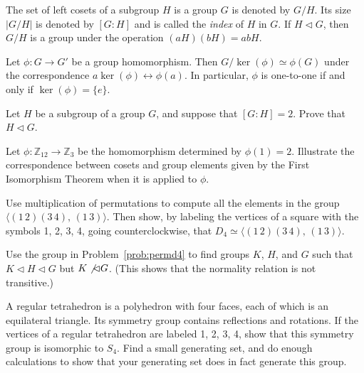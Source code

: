 \begin{theorem}
 The set of left cosets of a subgroup $H$ is a group $G$ is denoted by $G/H$. Its size $|G/H|$ is denoted by $[G:H]$ and is called the \emph{index} of $H$ in $G$.
 If $H\lhd G$, then $G/H$ is a group under the operation $(aH)(bH)=abH$.
\end{theorem}

\begin{theorem}
 Let $\phi:G \longrightarrow G'$ be a group homomorphism. Then $G/\ker(\phi) \simeq \phi(G)$ under the correspondence $a\ker(\phi) \leftrightarrow \phi(a)$. In particular, $\phi$ is one-to-one if and only if $\ker(\phi) = \{e\}$.
\end{theorem}

\begin{problem}
Let $H$ be a subgroup of a group $G$, and suppose that $[G : H] = 2$.  Prove that $H \lhd G$.
\end{problem}



\begin{problem}
Let $\phi : \mathbb{Z}_{12} \longrightarrow \mathbb{Z}_{3}$ be the homomorphism determined by $\phi(1) = 2$.  Illustrate the correspondence between cosets and group elements given by the First Isomorphism Theorem when it is applied to $\phi$.
\end{problem}



\begin{problem}\label{prob:permd4}
Use multiplication of permutations to compute all the elements in the group $\langle (1\,2)(3\,4),\,(1\,3)\rangle$. Then show, by labeling the vertices of a square with the symbols 1, 2, 3, 4, going counterclockwise, that $D_4 \simeq \langle (1\,2)(3\,4),\,(1\,3)\rangle$.
\end{problem}



\begin{problem}
Use the group in Problem~\ref{prob:permd4} to find groups $K$, $H$, and $G$ such that $K \lhd H \lhd G$ but $K \not\lhd G$. (This shows that the normality relation is not transitive.)
\end{problem}



\begin{problem}\label{prob:tetgp}
A regular tetrahedron is a polyhedron with four faces, each of which is an equilateral triangle. Its symmetry group contains reflections and rotations. If the vertices of a regular tetrahedron are labeled 1, 2, 3, 4, show that this symmetry group is isomorphic to $S_4$. Find a small generating set, and do enough calculations to show that your generating set does in fact generate this group.
\end{problem}



